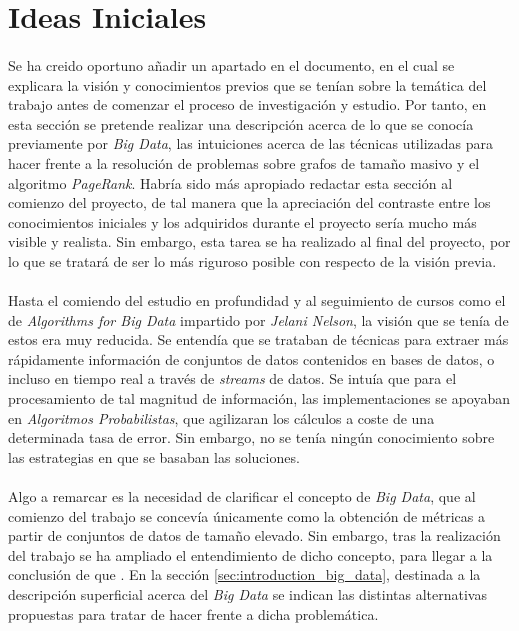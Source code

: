 \documentclass{subfiles}
\begin{document}
    \section{Ideas Iniciales}
    \label{sec:introduction_initial_ideas}

      \paragraph{}
      Se ha creido oportuno añadir un apartado en el documento, en el cual se explicara la visión y conocimientos previos que se tenían sobre la temática del trabajo antes de comenzar el proceso de investigación y estudio. Por tanto, en esta sección se pretende realizar una descripción acerca de lo que se conocía previamente por \emph{Big Data}, las intuiciones acerca de las técnicas utilizadas para hacer frente a la resolución de problemas sobre grafos de tamaño masivo y el algoritmo \emph{PageRank}. Habría sido más apropiado redactar esta sección al comienzo del proyecto, de tal manera que la apreciación del contraste entre los conocimientos iniciales y los adquiridos durante el proyecto sería mucho más visible y realista. Sin embargo, esta tarea se ha realizado al final del proyecto, por lo que se tratará de ser lo más riguroso posible con respecto de la visión previa.

      \paragraph{}
      Hasta el comiendo del estudio en profundidad y al seguimiento de cursos como el de \emph{Algorithms for Big Data} \cite{bigdata2015jelani} impartido por \emph{Jelani Nelson}, la visión que se tenía de estos era muy reducida. Se entendía que se trataban de técnicas para extraer más rápidamente información de conjuntos de datos contenidos en bases de datos, o incluso en tiempo real a través de \emph{streams} de datos. Se intuía que para el procesamiento de tal magnitud de información, las implementaciones se apoyaban en \emph{Algoritmos Probabilistas}, que agilizaran los cálculos a coste de una determinada tasa de error. Sin embargo, no se tenía ningún conocimiento sobre las estrategias en que se basaban las soluciones.

      \paragraph{}
      Algo a remarcar es la necesidad de clarificar el concepto de \emph{Big Data}, que al comienzo del trabajo se concevía únicamente como la obtención de métricas a partir de conjuntos de datos de tamaño elevado. Sin embargo, tras la realización del trabajo se ha ampliado el entendimiento de dicho concepto, para llegar a la conclusión de que . En la sección \ref{sec:introduction_big_data}, destinada a la descripción superficial acerca del \emph{Big Data} se indican las distintas alternativas propuestas para tratar de hacer frente a dicha problemática.
\end{document}
